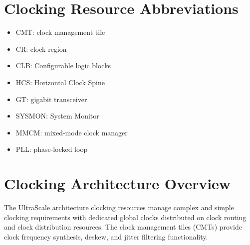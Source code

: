 \documentclass[12pt, a4paper]{report}
\begin{document}
    \section{Clocking Resource Abbreviations}
    \begin{itemize}
        \item CMT: clock management tile
        \item CR: clock region
        \item CLB: Configurable logic blocks
        \item HCS: Horizontal Clock Spine 
        \item GT: gigabit transceiver
        \item SYSMON: System Monitor
        \item MMCM: mixed-mode clock manager 
        \item PLL: phase-locked loop        
    \end{itemize}

    \section{Clocking Architecture Overview}
    The UltraScale architecture clocking resources manage complex and simple clocking requirements with dedicated global clocks distributed on clock routing and clock distribution resources. The clock management tiles (CMTs) provide clock frequency synthesis, deskew, and jitter filtering functionality. 
\end{document}
